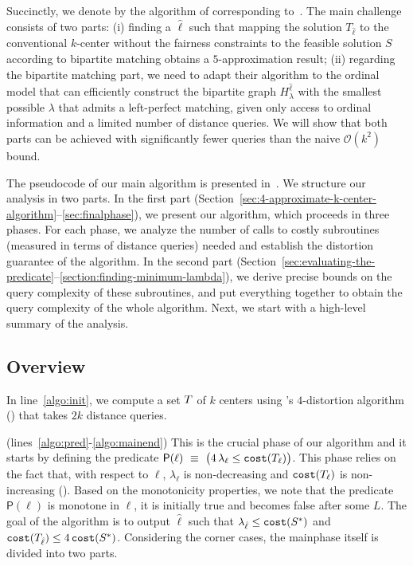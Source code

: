\documentclass{article}
\newcommand{\bigO}{\ensuremath{\mathcal{O}}\xspace}
\begin{document}
Succinctly, we denote by \bcfrss the algorithm of \citet{burkhardt2024low} corresponding to~.
The main challenge consists of two parts: (i) finding a $\hat{\ell}$ such that mapping the solution $T_{\hat{\ell}}$ to the conventional $k$-center without the fairness constraints to the feasible solution $S$ according to bipartite matching obtains a $5$-approximation result; (ii) regarding the bipartite matching part, we need to adapt their algorithm to the ordinal model that can efficiently construct the bipartite graph $H^{\hat{\ell}}_{\lambda}$ with the smallest possible $\lambda$ that admits a left-perfect matching, given only access to ordinal information and a limited number of distance queries.
We will show that both parts can be achieved with significantly fewer queries than the naive $\bigO(k^2)$ bound.

The pseudocode of our main algorithm is presented in~. 
We structure our analysis in two parts. 
In the first part (Section~\ref{sec:4-approximate-k-center-algorithm}--\ref{sec:finalphase}), we present our algorithm, which proceeds in three phases. 
For each phase, we analyze the number of calls to costly subroutines (measured in terms of distance queries) needed and establish the distortion guarantee of the algorithm.
In the second part (Section~\ref{sec:evaluating-the-predicate}--\ref{section:finding-minimum-lambda}), we derive precise bounds on the query complexity of these subroutines, and put everything together to obtain the query complexity of the whole algorithm.
Next, we start with a high-level summary of the analysis.
\subsection{Overview}

 In line~\ref{algo:init}, we compute a set $T$ of $k$ centers using \citet{burkhardt2024low}'s $4$-distortion algorithm () that takes $2k$ distance queries.

 (lines~\ref{algo:pred}-\ref{algo:mainend})
This is the crucial phase of our algorithm and it starts by defining the predicate $\mathsf{P}(\ell) ~\equiv~ \bigl( 4\,\lambda_{\ell} \leq \texttt{cost}(T_{\ell}) \bigr)$. 
This phase relies on the fact that, with respect to $\ell$, $\lambda_{\ell}$ is non-decreasing and $\texttt{cost}(T_{\ell})$ is non-increasing (). 
    Based on the monotonicity properties, we note that the predicate $\mathsf{P}(\ell)$ is monotone in $\ell$, it is initially true and becomes false after some $L$.
    The goal of the algorithm is to output $\hat{\ell}$ such that $\lambda_{\hat{\ell}} \leq \texttt{cost}(S^*)$ and $\texttt{cost}(T_{\hat{\ell}}) \leq 4\, \texttt{cost}(S^*)$.
    Considering the corner cases, the mainphase itself is divided into two parts.
\end{document}
